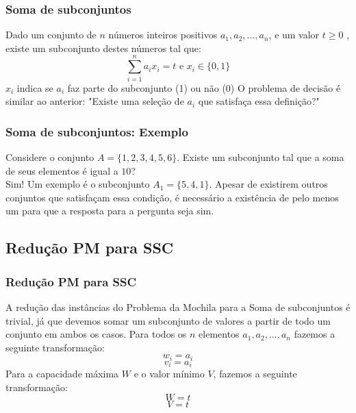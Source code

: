 \documentclass{beamer}
\begin{document}
\begin{frame}
    \frametitle{Soma de subconjuntos}
        Dado um conjunto de $n$ números inteiros positivos $a_{1}, a_{2}, ..., a_{n}$, e um valor $t \geq 0$ , existe um subconjunto destes números tal que:
         \begin{equation*}
            \sum_{i=1}^{n} a_{i} x_{i} = t \mbox{ e } x_{i} \in \{0,1\}
         \end{equation*}
        $x_{i}$ indica se $a_{i}$ faz parte do subconjunto (1) ou não (0)
        \newline
        \newline
        O problema de decisão é similar ao anterior: "Existe uma seleção de $a_{i}$ que satisfaça essa definição?"
\end{frame}

\begin{frame}
    \frametitle{Soma de subconjuntos: Exemplo}
        Considere o conjunto $A = \{1, 2, 3, 4, 5, 6\}$. Existe um subconjunto tal que a soma de seus elementos é igual a $10$? \\
        Sim! Um exemplo é o subconjunto $A_{1} = \{5, 4, 1\}$. Apesar de existirem outros conjuntos que satisfaçam essa condição, é necessário a existência de pelo menos um para que a resposta para a pergunta seja sim.
\end{frame}

\subsection{Redução PM para SSC}
\begin{frame}
    \frametitle{Redução PM para SSC}
        A redução das instâncias do Problema da Mochila para a Soma de subconjuntos é trivial, já que devemos somar um subconjunto de valores a partir de todo um conjunto em ambos os casos.
        \newline
        \newline
        Para todos os $n$ elementos $a_{1}, a_{2}, ..., a_{n}$ fazemos a seguinte transformação:
        \begin{equation*}
            w_{i} = a_{i}
        \end{equation*}
        \begin{equation*}
            v_{i} = a_{i}
        \end{equation*}
        Para a capacidade máxima $W$ e o valor mínimo $V$, fazemos a seguinte transformação:
        \begin{equation*}
            W = t
        \end{equation*}
        \begin{equation*}
            V = t
        \end{equation*}
        
\end{frame}
\end{document}
